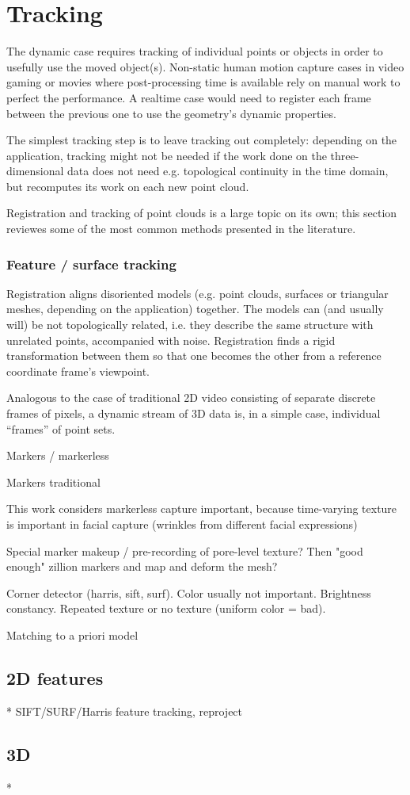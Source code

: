 \section{Tracking}

The dynamic case requires tracking of individual points or objects in order to usefully use the moved object(s). Non-static human motion capture cases in video gaming or movies where post-processing time is available rely on manual work to perfect the performance. A realtime case would need to register each frame between the previous one to use the geometry's dynamic properties.

The simplest tracking step is to leave tracking out completely: depending on the application, tracking might not be needed if the work done on the three-dimensional data does not need e.g. topological continuity in the time domain, but recomputes its work on each new point cloud.

Registration and tracking of point clouds is a large topic on its own; this section reviewes some of the most common methods presented in the literature.

\subsubsection{Feature / surface tracking}

Registration aligns disoriented models (e.g. point clouds, surfaces or triangular meshes, depending on the application) together. The models can (and usually will) be not topologically related, i.e. they describe the same structure with unrelated points, accompanied with noise. Registration finds a rigid transformation between them so that one becomes the other from a reference coordinate frame's viewpoint.

Analogous to the case of traditional 2D video consisting of separate discrete frames of pixels, a dynamic stream of 3D data is, in a simple case, individual ``frames'' of point sets.

Markers / markerless

Markers traditional


This work considers markerless capture important, because time-varying texture is important in facial capture (wrinkles from different facial expressions)

Special marker makeup / pre-recording of pore-level texture? Then "good enough" zillion markers and map and deform the mesh?

Corner detector (harris, sift, surf). Color usually not important. Brightness constancy. Repeated texture or no texture (uniform color = bad).

Matching to a priori model

\subsection{2D features}

* SIFT/SURF/Harris feature tracking, reproject

\subsection{3D}

*

